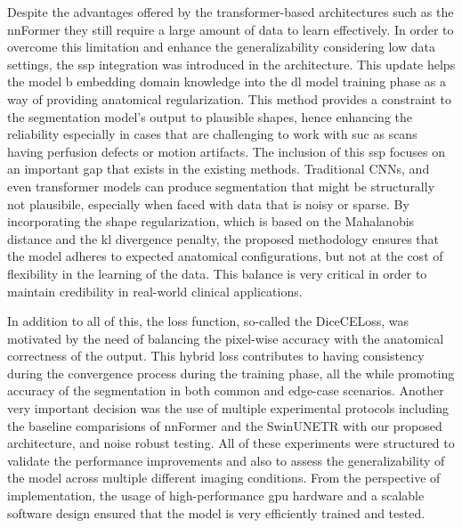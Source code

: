 Despite the advantages offered by the transformer-based architectures such as the nnFormer they still require a large amount of data to learn effectively. In order to overcome this limitation and enhance the generalizability considering low data settings, the \gls{ssp} integration was introduced in the architecture. This update helps the model b embedding domain knowledge into the \gls{dl} model training phase as a way of providing anatomical regularization. This method provides a constraint to the segmentation model's output to plausible shapes, hence enhancing the reliability especially in cases that are challenging to work with suc as scans having perfusion defects or motion artifacts. The inclusion of this \gls{ssp} focuses on an important gap that exists in the existing methods. Traditional CNNs, and even transformer models can produce segmentation that might be structurally not plausibile, especially when faced with data that is noisy or sparse. By incorporating the shape regularization, which is based on the Mahalanobis distance and the \gls{kl} divergence penalty, the proposed methodology ensures that the model adheres to expected anatomical configurations, but not at the cost of flexibility in the learning of the data. This balance is very critical in order to maintain credibility in real-world clinical applications.

In addition to all of this, the loss function, so-called the DiceCELoss, was motivated by the need of balancing the pixel-wise accuracy with the anatomical correctness of the output. This hybrid loss contributes to having consistency during the convergence process during the training phase, all the while promoting accuracy of the segmentation in both common and edge-case scenarios. Another very important decision was the use of multiple experimental protocols including the baseline comparisions of nnFormer and the SwinUNETR with our proposed architecture, and noise robust testing. All of these experiments were structured to validate the performance improvements and also to assess the generalizability of the model across multiple different imaging conditions. From the perspective of implementation, the usage of high-performance \gls{gpu} hardware and a scalable software design ensured that the model is very efficiently trained and tested.

